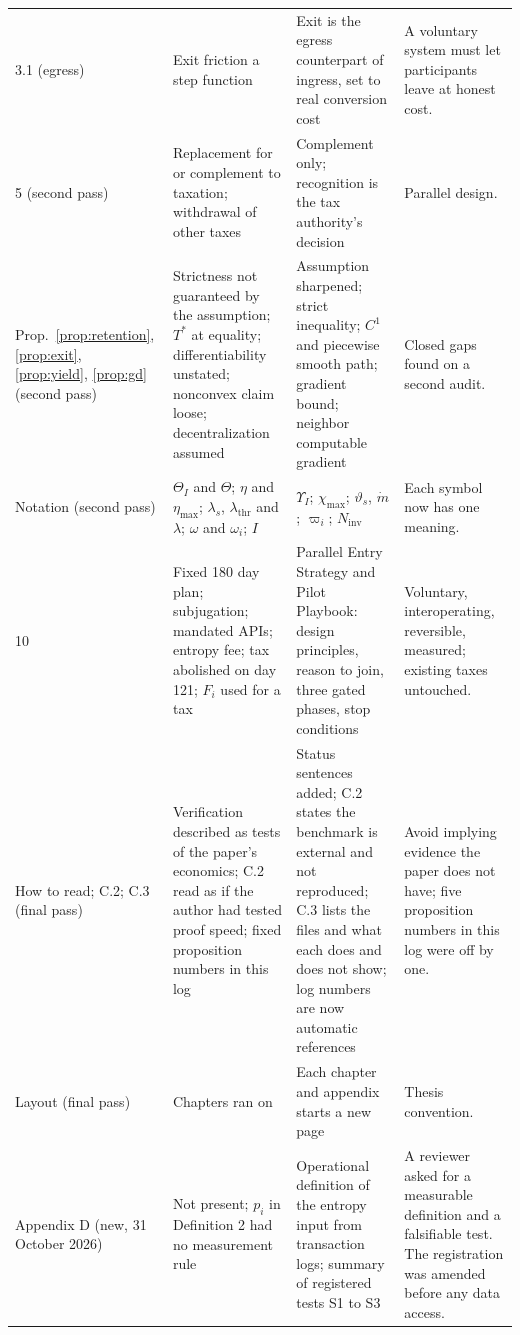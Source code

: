 \documentclass[11pt,a4paper]{article}
\theoremstyle{definition}
\theoremstyle{plain}
\theoremstyle{remark}
\begin{document}
\begin{longtable}{@{}p{1.9cm}p{4.0cm}p{5.2cm}p{4.1cm}@{}}
3.1 (egress) & Exit friction a step function & Exit is the egress counterpart of ingress, set to real conversion cost & A voluntary system must let participants leave at honest cost. \\
5 (second pass) & Replacement for or complement to taxation; withdrawal of other taxes & Complement only; recognition is the tax authority's decision & Parallel design. \\
Prop.~\ref{prop:retention}, \ref{prop:exit}, \ref{prop:yield}, \ref{prop:gd} (second pass) & Strictness not guaranteed by the assumption; $T^{*}$ at equality; differentiability unstated; nonconvex claim loose; decentralization assumed & Assumption sharpened; strict inequality; $C^1$ and piecewise smooth path; gradient bound; neighbor computable gradient & Closed gaps found on a second audit. \\
Notation (second pass) & $\Theta_I$ and $\Theta$; $\eta$ and $\eta_{\max}$; $\lambda_s$, $\lambda_{\mathrm{thr}}$ and $\lambda$; $\omega$ and $\omega_i$; $I$ & $\Upsilon_I$; $\chi_{\max}$; $\vartheta_s$, $\dot m$; $\varpi_i$; $N_{\mathrm{inv}}$ & Each symbol now has one meaning. \\
10 & Fixed 180 day plan; subjugation; mandated APIs; entropy fee; tax abolished on day 121; $F_i$ used for a tax & Parallel Entry Strategy and Pilot Playbook: design principles, reason to join, three gated phases, stop conditions & Voluntary, interoperating, reversible, measured; existing taxes untouched. \\
How to read; C.2; C.3 (final pass) & Verification described as tests of the paper's economics; C.2 read as if the author had tested proof speed; fixed proposition numbers in this log & Status sentences added; C.2 states the benchmark is external and not reproduced; C.3 lists the files and what each does and does not show; log numbers are now automatic references & Avoid implying evidence the paper does not have; five proposition numbers in this log were off by one. \\
Layout (final pass) & Chapters ran on & Each chapter and appendix starts a new page & Thesis convention. \\
Appendix D (new, 31 October 2026) & Not present; $p_i$ in Definition 2 had no measurement rule & Operational definition of the entropy input from transaction logs; summary of registered tests S1 to S3 & A reviewer asked for a measurable definition and a falsifiable test. The registration was amended before any data access. \\
\bottomrule
\end{longtable}
\end{document}
